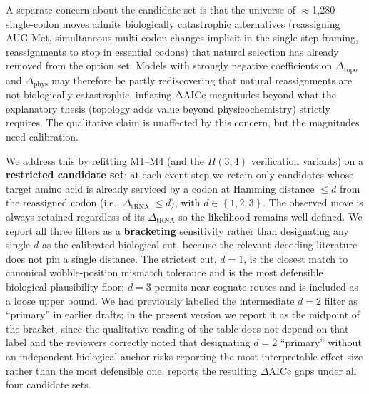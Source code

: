 \documentclass[preprint,11pt,authoryear,a4paper]{elsarticle}
\begin{document}
A separate concern about the candidate set is that the universe of
\(\approx\)1,280 single-codon moves admits biologically catastrophic
alternatives (reassigning AUG-Met, simultaneous multi-codon changes
implicit in the single-step framing, reassignments to stop in essential
codons) that natural selection has already removed from the option set.
Models with strongly negative coefficients on \(\Delta_{\text{topo}}\)
and \(\Delta_{\text{phys}}\) may therefore be partly rediscovering that
natural reassignments are not biologically catastrophic, inflating ΔAICc
magnitudes beyond what the explanatory thesis (topology adds value
beyond physicochemistry) strictly requires. The qualitative claim is
unaffected by this concern, but the magnitudes need calibration.

We address this by refitting M1--M4 (and the \(H(3,4)\) verification
variants) on a \textbf{restricted candidate set}: at each event-step we
retain only candidates whose target amino acid is already serviced by a
codon at Hamming distance \(\leq d\) from the reassigned codon (i.e.,
\(\Delta_{\text{tRNA }} \leq d\)), with
\(d \in \left\{ 1,2,3 \right\}\). The observed move is always retained
regardless of its \(\Delta_{\text{tRNA}}\) so the likelihood remains
well-defined. We report all three filters as a \textbf{bracketing}
sensitivity rather than designating any single \(d\) as the calibrated
biological cut, because the relevant decoding literature does not pin a
single distance. The strictest cut, \(d = 1\), is the closest match to
canonical wobble-position mismatch tolerance \citep{crick1966} and is
the most defensible biological-plausibility floor; \(d = 3\) permits
near-cognate routes and is included as a loose upper bound. We had
previously labelled the intermediate \(d = 2\) filter as ``primary'' in
earlier drafts; in the present version we report it as the midpoint of
the bracket, since the qualitative reading of the table does not depend
on that label and the reviewers correctly noted that designating
\(d = 2\) ``primary'' without an independent biological anchor risks
reporting the most interpretable effect size rather than the most
defensible one.  reports the resulting
\(\Delta\)AICc gaps under all four candidate sets.
\end{document}
